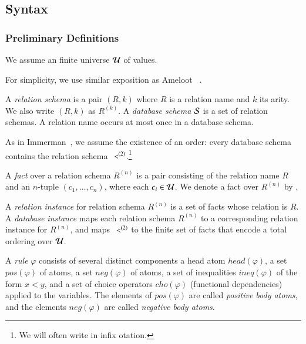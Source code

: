 \subsection{Syntax}

\subsubsection{Preliminary Definitions}


We assume an finite universe $\univ$ of values.

For simplicity, we use similar exposition as Ameloot \etal~\cite{ameloot-operational}.

A {\em relation schema} is a pair $(R,k)$ where $R$ is a relation name and $k$ its arity.  We also write $(R,k)$ as $R^{(k)}$.
A {\em database schema} $\schema$ is a set of relation schemas.  A relation name occurs at most once in a database schema.

As in Immerman~\cite{immerman-ptime}, we assume
the existence of an order: every database schema contains the relation schema
$\dedalus{<}^{(2)}$.\footnote{We will often write \dedalus{<} in infix otation.}

A {\em fact} over a relation schema $R^{(n)}$ is a pair consisting of
the relation name $R$ and an $n$-tuple $(c_1,\ldots,c_n)$, where each
$c_i \in \univ$.  We denote a fact over $R^{(n)}$ by .

A {\em relation instance} for relation schema $R^{(n)}$ is a set of facts whose relation is $R$.
A {\em database instance} maps each relation schema $R^{(n)}$ to a corresponding relation instance for
$R^{(n)}$, and maps $\dedalus{<}^{(2)}$ to the finite set of \dedalus{<} facts that encode a total ordering over $\univ$.

A {\em rule} $\varphi$ consists of several distinct components a head atom $head(\varphi)$, a set $pos(\varphi)$ of atoms, a set $neg(\varphi)$ of atoms, a set of inequalities $ineq(\varphi)$ of the form $x < y$, and a set of choice operators $cho(\varphi)$ (functional dependencies) applied to the variables.  The elements of $pos(\varphi)$ are called {\em positive body atoms}, and the elements $neg(\varphi)$ are called {\em negative body atoms}.

